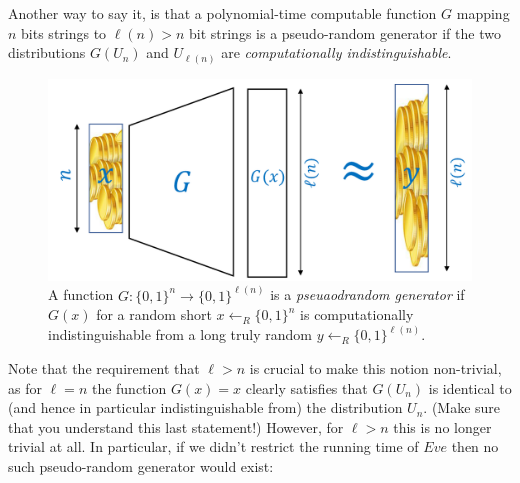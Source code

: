 Another way to say it, is that a polynomial-time computable function
\(G\) mapping \(n\) bits strings to \(\ell(n)>n\) bit strings is a
pseudo-random generator if the two distributions \(G(U_n)\) and
\(U_{\ell(n)}\) are \emph{computationally indistinguishable}.


\begin{figure}
\centering
\includegraphics[width=\textwidth, height=0.25\paperheight, keepaspectratio]{../figure/prg_def.png}
\caption{A function \(G:\{0,1\}^n \rightarrow \{0,1\}^{\ell(n)}\) is a
\emph{pseuaodrandom generator} if \(G(x)\) for a random short
\(x \leftarrow_R \{0,1\}^n\) is computationally indistinguishable from a
long truly random \(y \leftarrow_R \{0,1\}^{\ell(n)}\).}
\label{prgdeffig}
\end{figure}

Note that the requirement that \(\ell>n\) is crucial to make this notion
non-trivial, as for \(\ell=n\) the function \(G(x)=x\) clearly satisfies
that \(G(U_n)\) is identical to (and hence in particular
indistinguishable from) the distribution \(U_n\). (Make sure that you
understand this last statement!) However, for \(\ell>n\) this is no
longer trivial at all. In particular, if we didn't restrict the running
time of \(Eve\) then no such pseudo-random generator would exist:

